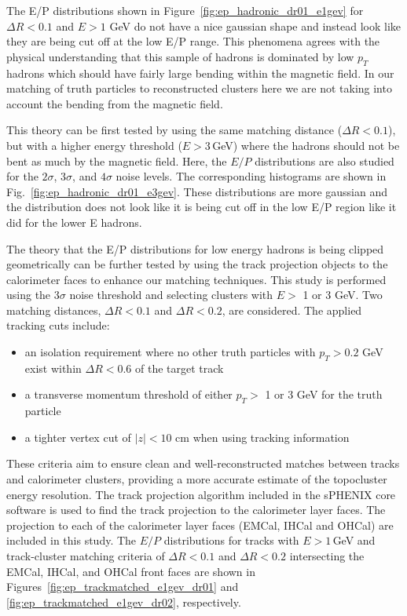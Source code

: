 The E/P distributions shown in Figure~\ref{fig:ep_hadronic_dr01_e1gev} for $\Delta R < 0.1$ and $E > 1$ GeV do not have a nice gaussian shape and instead look like they are being cut off at the low E/P range. This phenomena agrees with the physical understanding that this sample of hadrons is dominated by low $p_{T}$ hadrons which should have fairly large bending within the magnetic field. In our matching of truth particles to reconstructed clusters here we are not taking into account the bending from the magnetic field.

This theory can be first tested by using the same matching distance ($\Delta R < 0.1$), but with a higher energy threshold ($E > 3$\,GeV) where the hadrons should not be bent as much by the magnetic field. Here, the $E/P$ distributions are also studied for the $2\sigma$, $3\sigma$, and $4\sigma$ noise levels. The corresponding histograms are shown in Fig.~\ref{fig:ep_hadronic_dr01_e3gev}. These distributions are more gaussian and the distribution does not look like it is being cut off in the low E/P region like it did for the lower E hadrons.

The theory that the E/P distributions for low energy hadrons is being clipped geometrically can be further tested by using the track projection objects to the calorimeter faces to enhance our matching techniques. This study is performed using the $3\sigma$ noise threshold and selecting clusters with $E >$ 1 or 3 GeV. Two matching distances, $\Delta R < 0.1$ and $\Delta R < 0.2$, are considered. The applied tracking cuts include:  
\begin{itemize}
    \item an isolation requirement where no other truth particles with $p_T > 0.2$ GeV exist within $\Delta R < 0.6$ of the target track
    \item a transverse momentum threshold of either $p_T >$ 1 or 3 GeV for the truth particle
    \item a tighter vertex cut of $|z| < 10$ cm when using tracking information
\end{itemize}

These criteria aim to ensure clean and well-reconstructed matches between tracks and calorimeter clusters, providing a more accurate estimate of the topocluster energy resolution. The track projection algorithm included in the sPHENIX core software is used to find the track projection to the calorimeter layer faces. The projection to each of the calorimeter layer faces (EMCal, IHCal and OHCal) are included in this study. 
The $E/P$ distributions for tracks with $E > 1$\,GeV and track-cluster matching criteria of $\Delta R < 0.1$ and $\Delta R < 0.2$ intersecting the EMCal, IHCal, and OHCal front faces are shown in Figures~\ref{fig:ep_trackmatched_e1gev_dr01} and \ref{fig:ep_trackmatched_e1gev_dr02}, respectively.

